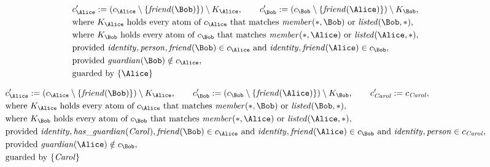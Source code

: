 \begin{align*}
&
c'_
{
\Alice
}
 := 
(c_
{
\Alice
}
 \setminus 
\{
\mathit{\detokenize{
friend
}}
(
\Bob
)
\}
) \setminus K_
{
\Alice
}
, \qquad 
c'_
{
\Bob
}
 := 
(c_
{
\Bob
}
 \setminus 
\{
\mathit{\detokenize{
friend
}}
(
\Alice
)
\}
) \setminus K_
{
\Bob
}
,\\
&
\text{where } K_
{
\Alice
}
 \text{ holds every atom of } c_
{
\Alice
}
 \text{ that matches } 
\mathit{\detokenize{
member
}}
(
\ast
,
\Bob
)
 \text{ or } 
\mathit{\detokenize{
listed
}}
(
\Bob
,
\ast
)
,\\
&
\text{where } K_
{
\Bob
}
 \text{ holds every atom of } c_
{
\Bob
}
 \text{ that matches } 
\mathit{\detokenize{
member
}}
(
\ast
,
\Alice
)
 \text{ or } 
\mathit{\detokenize{
listed
}}
(
\Alice
,
\ast
)
,\\
&
\text{provided } 
\mathit{\detokenize{
identity
}}
,
\mathit{\detokenize{
person
}}
,
\mathit{\detokenize{
friend
}}
(
\Bob
)
 \in c_
{
\Alice
}
 \text{ and } 
\mathit{\detokenize{
identity
}}
,
\mathit{\detokenize{
friend
}}
(
\Alice
)
 \in c_
{
\Bob
}
,\\
&
\text{provided } 
\mathit{\detokenize{
guardian
}}
(
\Bob
)
 \notin c_
{
\Alice
}
,\\
&
\text{guarded by } \{
\Alice
\}
\end{align*}

\begin{align*}
&
c'_
{
\Alice
}
 := 
(c_
{
\Alice
}
 \setminus 
\{
\mathit{\detokenize{
friend
}}
(
\Bob
)
\}
) \setminus K_
{
\Alice
}
, \qquad 
c'_
{
\Bob
}
 := 
(c_
{
\Bob
}
 \setminus 
\{
\mathit{\detokenize{
friend
}}
(
\Alice
)
\}
) \setminus K_
{
\Bob
}
, \qquad 
c'_
{
\mathit{Carol}
}
 := 
c_
{
\mathit{Carol}
}
,\\
&
\text{where } K_
{
\Alice
}
 \text{ holds every atom of } c_
{
\Alice
}
 \text{ that matches } 
\mathit{\detokenize{
member
}}
(
\ast
,
\Bob
)
 \text{ or } 
\mathit{\detokenize{
listed
}}
(
\Bob
,
\ast
)
,\\
&
\text{where } K_
{
\Bob
}
 \text{ holds every atom of } c_
{
\Bob
}
 \text{ that matches } 
\mathit{\detokenize{
member
}}
(
\ast
,
\Alice
)
 \text{ or } 
\mathit{\detokenize{
listed
}}
(
\Alice
,
\ast
)
,\\
&
\text{provided } 
\mathit{\detokenize{
identity
}}
,
\mathit{\detokenize{
has_guardian
}}
(
\mathit{Carol}
)
,
\mathit{\detokenize{
friend
}}
(
\Bob
)
 \in c_
{
\Alice
}
 \text{ and } 
\mathit{\detokenize{
identity
}}
,
\mathit{\detokenize{
friend
}}
(
\Alice
)
 \in c_
{
\Bob
}
 \text{ and } 
\mathit{\detokenize{
identity
}}
,
\mathit{\detokenize{
person
}}
 \in c_
{
\mathit{Carol}
}
,\\
&
\text{provided } 
\mathit{\detokenize{
guardian
}}
(
\Alice
)
 \notin c_
{
\Bob
}
,\\
&
\text{guarded by } \{
\mathit{Carol}
\}
\end{align*}
